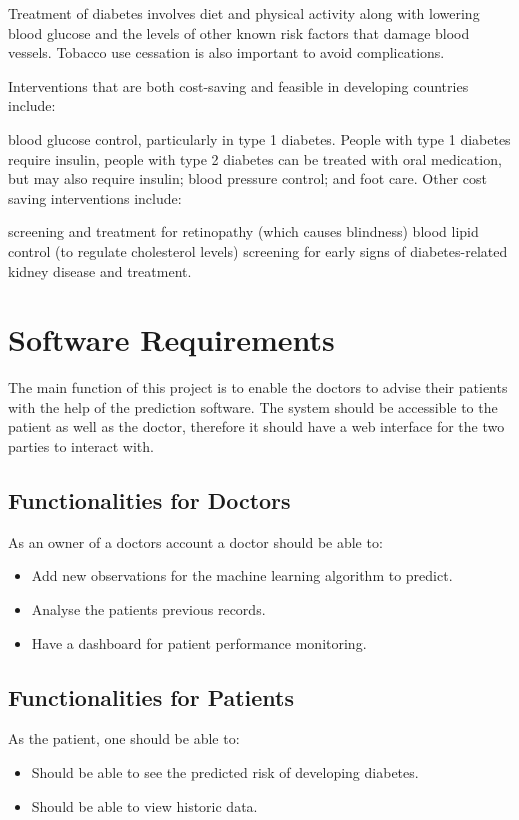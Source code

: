 \documentclass[12pt]{article}
\begin{document}
Treatment of diabetes involves diet and physical activity along with lowering blood glucose and the levels of other known risk factors that damage blood vessels. Tobacco use cessation is also important to avoid complications.

Interventions that are both cost-saving and feasible in developing countries include:

blood glucose control, particularly in type 1 diabetes. People with type 1 diabetes require insulin, people with type 2 diabetes can be treated with oral medication, but may also require insulin;
blood pressure control; and
foot care.
Other cost saving interventions include:

screening and treatment for retinopathy (which causes blindness)
blood lipid control (to regulate cholesterol levels)
screening for early signs of diabetes-related kidney disease and treatment.

\newpage
\section{Software Requirements}
The main function of this project is to enable the doctors to advise their patients with the help of the prediction software. The system should be accessible to the patient as well as the doctor, therefore it should have a web interface for the two parties to interact with.

\subsection{Functionalities for Doctors}
As an owner of a doctors account a doctor should be able to:
\begin{itemize}
\item Add new observations for the machine learning algorithm to predict.
\item Analyse the patients previous records.
\item Have a dashboard for patient performance monitoring.
\end{itemize}

\subsection{Functionalities for Patients}
As the patient, one should be able to:
\begin{itemize}
\item Should be able to see the predicted risk of developing diabetes.
\item Should be able to view historic data.
\end{itemize}
\end{document}
